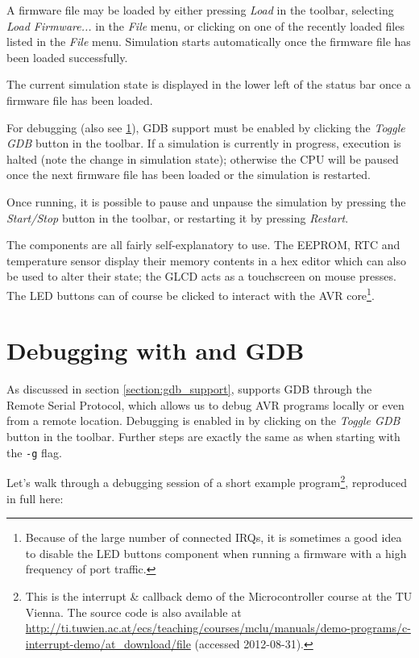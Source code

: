 A firmware file may be loaded by either pressing \emph{Load} in the toolbar,
selecting \emph{Load Firmware...} in the \emph{File} menu, or clicking on one of
the recently loaded files listed in the \emph{File} menu. Simulation starts
automatically once the firmware file has been loaded successfully.

The current simulation state is displayed in the lower left of the status bar
once a firmware file has been loaded.

For debugging (also see \ref{section:debugging}), \ac{GDB} support must be enabled
by clicking the \emph{Toggle \ac{GDB}} button in the toolbar. If a simulation is
currently in progress, execution is halted (note the change in simulation state);
otherwise the \ac{CPU} will be paused once the next firmware file has been loaded
or the simulation is restarted.

Once running, it is possible to pause and unpause the simulation by pressing the
\emph{Start/Stop} button in the toolbar, or restarting it by pressing
\emph{Restart}.

The components are all fairly self-explanatory to use. The \ac{EEPROM}, \ac{RTC}
and temperature sensor display their memory contents in a hex editor which
can also be used to alter their state; the \ac{GLCD} acts as a touchscreen on
mouse presses. The \ac{LED} buttons can of course be clicked to interact with the
\ac{AVR} core\footnote{
%
Because of the large number of connected \acp{IRQ}, it is sometimes a good idea
to disable the \ac{LED} buttons component when running a firmware with a high
frequency of port traffic.
%
}.


\section{Debugging with \simavr and \ac{GDB}} \label{section:debugging}

As discussed in section \ref{section:gdb_support}, \simavr supports \ac{GDB}
through the Remote Serial Protocol, which allows us to debug \ac{AVR} programs
locally or even from a remote location. Debugging is enabled in \qsimavr by
clicking on the \emph{Toggle \ac{GDB}} button in the toolbar. Further steps
are exactly the same as when starting \simavr with the \verb|-g| flag.

Let's walk through a debugging session of a short example program\footnote{
%
This is the interrupt \& callback demo of the Microcontroller course at the
\ac{TU} Vienna. The source code is  also available at \url{http://ti.tuwien.ac.at/ecs/teaching/courses/mclu/manuals/demo-programs/c-interrupt-demo/at_download/file} (accessed 2012-08-31).
%
}, reproduced
in full here:


